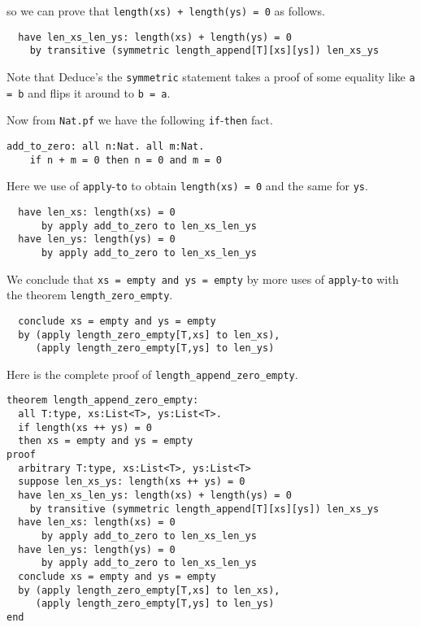\documentclass[12pt]{article}
\begin{document}
\noindent so we can prove that \texttt{length(xs) + length(ys) = 0} as
follows.

\begin{verbatim}
  have len_xs_len_ys: length(xs) + length(ys) = 0
    by transitive (symmetric length_append[T][xs][ys]) len_xs_ys
\end{verbatim}

\noindent Note that Deduce's the \texttt{symmetric} statement takes a
proof of some equality like \texttt{a = b} and flips it around to
\texttt{b = a}.

Now from \texttt{Nat.pf} we have the following \texttt{if}-\texttt{then} fact.

\begin{verbatim}
add_to_zero: all n:Nat. all m:Nat. 
    if n + m = 0 then n = 0 and m = 0
\end{verbatim}

\noindent Here we use of \texttt{apply}-\texttt{to} to obtain
\texttt{length(xs) = 0} and the same for \texttt{ys}.

\begin{verbatim}
  have len_xs: length(xs) = 0
      by apply add_to_zero to len_xs_len_ys
  have len_ys: length(ys) = 0
      by apply add_to_zero to len_xs_len_ys
\end{verbatim}

We conclude that \texttt{xs = empty and ys = empty} by more uses of
\texttt{apply}-\texttt{to} with the theorem
\texttt{length\_zero\_empty}.

\begin{verbatim}
  conclude xs = empty and ys = empty
  by (apply length_zero_empty[T,xs] to len_xs),
     (apply length_zero_empty[T,ys] to len_ys)
\end{verbatim}

Here is the complete proof of \texttt{length\_append\_zero\_empty}.

\begin{verbatim}
theorem length_append_zero_empty: 
  all T:type, xs:List<T>, ys:List<T>.
  if length(xs ++ ys) = 0
  then xs = empty and ys = empty
proof
  arbitrary T:type, xs:List<T>, ys:List<T>
  suppose len_xs_ys: length(xs ++ ys) = 0
  have len_xs_len_ys: length(xs) + length(ys) = 0
    by transitive (symmetric length_append[T][xs][ys]) len_xs_ys
  have len_xs: length(xs) = 0
      by apply add_to_zero to len_xs_len_ys
  have len_ys: length(ys) = 0
      by apply add_to_zero to len_xs_len_ys
  conclude xs = empty and ys = empty
  by (apply length_zero_empty[T,xs] to len_xs),
     (apply length_zero_empty[T,ys] to len_ys)
end
\end{verbatim}
\end{document}

